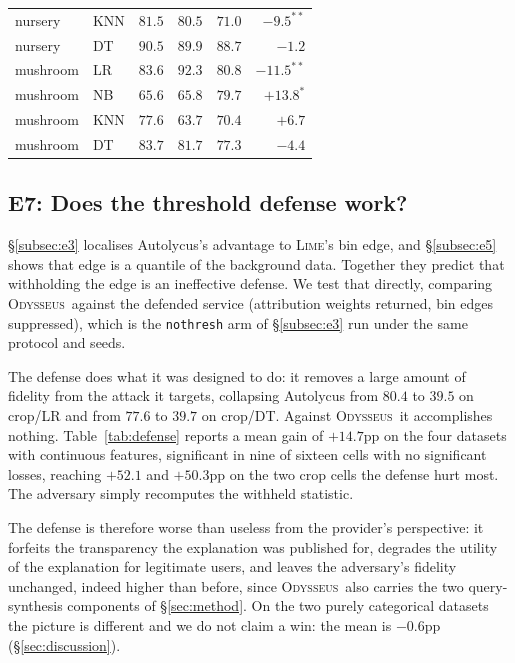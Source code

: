 \documentclass[sigconf,anonymous,review]{acmart}
\newcommand{\sys}{\textsc{Odysseus}}
\begin{document}
\begin{table}[t]
\begin{tabular}{llrrrr}
nursery    & KNN  & $81.5$ & $80.5$ & $71.0$ & $-9.5^{**}$ \\
nursery    & DT   & $90.5$ & $89.9$ & $88.7$ & $-1.2$ \\
mushroom   & LR   & $83.6$ & $92.3$ & $80.8$ & $-11.5^{**}$ \\
mushroom   & NB   & $65.6$ & $65.8$ & $79.7$ & $+13.8^{*}$ \\
mushroom   & KNN  & $77.6$ & $63.7$ & $70.4$ & $+6.7$ \\
mushroom   & DT   & $83.7$ & $81.7$ & $77.3$ & $-4.4$ \\
\bottomrule
\end{tabular}
\end{table}

\subsection{E7: Does the threshold defense work?}
\label{subsec:defense}
\S\ref{subsec:e3} localises Autolycus's advantage to \textsc{Lime}'s bin edge, and
\S\ref{subsec:e5} shows that edge is a quantile of the background data. Together they predict that
withholding the edge is an ineffective defense. We test that directly, comparing \sys\ against the defended service (attribution weights returned, bin edges suppressed), which is the
\texttt{nothresh} arm of \S\ref{subsec:e3} run under the same protocol and seeds.

The defense does what it was designed to do: it removes a large amount of fidelity from the attack it
targets, collapsing Autolycus from $80.4$ to $39.5$ on crop/LR and from $77.6$ to $39.7$ on crop/DT.
Against \sys\ it accomplishes nothing. Table~\ref{tab:defense} reports a mean gain of $+14.7$pp on the
four datasets with continuous features, significant in nine of sixteen cells with no significant
losses, reaching $+52.1$ and $+50.3$pp on the two crop cells the defense hurt most. The adversary
simply recomputes the withheld statistic.

The defense is therefore worse than useless from the provider's perspective: it forfeits the
transparency the explanation was published for, degrades the utility of the explanation for legitimate
users, and leaves the adversary's fidelity unchanged, indeed higher than before, since \sys\ also
carries the two query-synthesis components of \S\ref{sec:method}. On the two purely categorical
datasets the picture is different and we do not claim a win: the mean is $-0.6$pp
(\S\ref{sec:discussion}).
\end{document}
